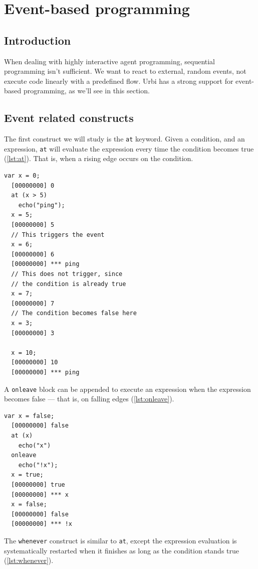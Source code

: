 \documentclass[openright,twoside,12pt]{report}
\newcommand{\urbi}{Urbi\xspace}
\newcommand{\lst}[1]{\autoref{lst:#1}}
\begin{document}

\chapter{Event-based programming}

\section{Introduction}

When dealing with highly interactive agent programming, sequential
programming isn't sufficient. We want to react to external, random
events, not execute code linearly with a predefined flow. \urbi has a
strong support for event-based programming, as we'll see in this
section.

\section{Event related constructs}

The first construct we will study is the \lstinline|at| keyword. Given
a condition, and an expression, \lstinline|at| will evaluate the
expression every time the condition becomes true (\lst{at}). That is,
when a rising edge occurs on the condition.

\begin{lstlisting}[caption=Using \texttt{at}, label=lst:at]
  var x = 0;
  [00000000] 0
  at (x > 5)
    echo("ping");
  x = 5;
  [00000000] 5
  // This triggers the event
  x = 6;
  [00000000] 6
  [00000000] *** ping
  // This does not trigger, since
  // the condition is already true
  x = 7;
  [00000000] 7
  // The condition becomes false here
  x = 3;
  [00000000] 3

  x = 10;
  [00000000] 10
  [00000000] *** ping
\end{lstlisting}

A \lstinline|onleave| block can be appended to execute an expression
when the expression becomes false --- that is, on falling edges (\lst{onleave}).

\begin{lstlisting}[caption=Using \texttt{at ... onleave},
  label=lst:onleave]
  var x = false;
  [00000000] false
  at (x)
    echo("x")
  onleave
    echo("!x");
  x = true;
  [00000000] true
  [00000000] *** x
  x = false;
  [00000000] false
  [00000000] *** !x
\end{lstlisting}

The \lstinline|whenever| construct is similar to \lstinline|at|,
except the expression evaluation is systematically restarted when it
finishes as long as the condition stands true (\lst{whenever}).
\end{document}

